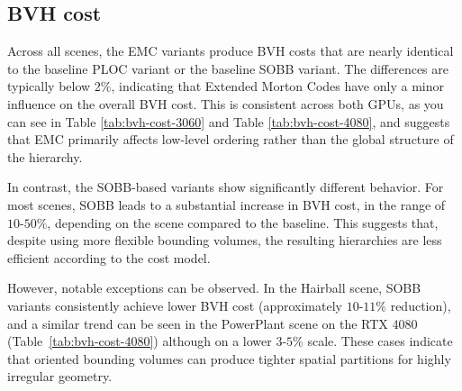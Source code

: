 \subsection{BVH cost}
\label{sec:bvh-cost}

Across all scenes, the EMC variants produce BVH costs that are nearly identical to the baseline PLOC variant or the baseline SOBB variant. The differences are typically below $2\%$, indicating that Extended Morton Codes have only a minor influence on the overall BVH cost. This is consistent across both GPUs, as you can see in Table \ref{tab:bvh-cost-3060} and Table \ref{tab:bvh-cost-4080}, and suggests that EMC primarily affects low-level ordering rather than the global structure of the hierarchy.

In contrast, the SOBB-based variants show significantly different behavior. For most scenes, SOBB leads to a substantial increase in BVH cost, in the range of $10\text{-}50\%$, depending on the scene compared to the baseline. This suggests that, despite using more flexible bounding volumes, the resulting hierarchies are less efficient according to the cost model.

However, notable exceptions can be observed. In the Hairball scene, SOBB variants consistently achieve lower BVH cost (approximately $10\text{-}11\%$ reduction), and a similar trend can be seen in the PowerPlant scene on the RTX 4080 (Table~\ref{tab:bvh-cost-4080}) although on a lower $3\text{-}5\%$ scale. These cases indicate that oriented bounding volumes can produce tighter spatial partitions for highly irregular geometry.


